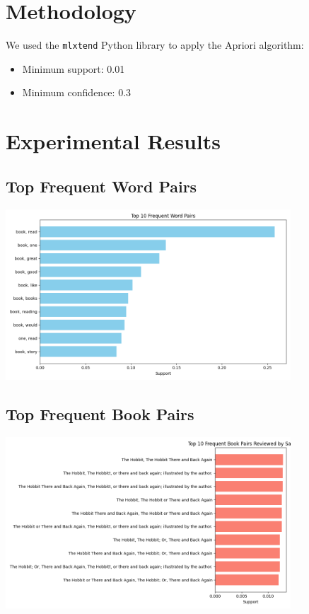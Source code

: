 \documentclass{article}
\begin{document}
\section{Methodology}
We used the \texttt{mlxtend} Python library to apply the Apriori algorithm:
\begin{itemize}
    \item Minimum support: 0.01
    \item Minimum confidence: 0.3
\end{itemize}

\section{Experimental Results}
\subsection*{Top Frequent Word Pairs}
\begin{center}
    \includegraphics[width=0.8\textwidth]{../images/frequent_word_pairs.png}
\end{center}

\subsection*{Top Frequent Book Pairs}
\begin{center}
    \includegraphics[width=0.8\textwidth]{../images/frequent_book_pairs.png}
\end{center}
\end{document}
